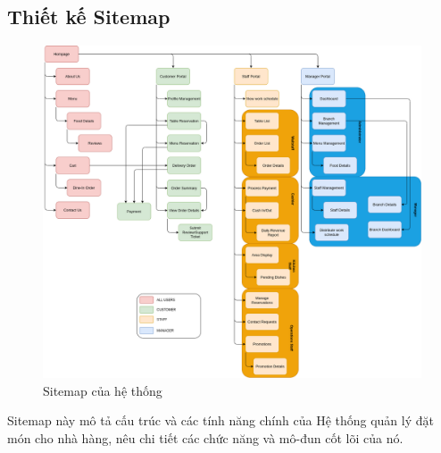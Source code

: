 \subsection{Thiết kế Sitemap}

\begin{figure}[H]
	\centering
	\includegraphics[width=\linewidth]{Images/sitemap.png}
	\vspace{0.5cm}
	\caption{Sitemap của hệ thống}
	\label{fig:my_label}
\end{figure}

Sitemap này mô tả cấu trúc và các tính năng chính của Hệ thống quản lý đặt món cho nhà hàng, nêu chi tiết các chức năng và mô-đun cốt lõi của nó.

